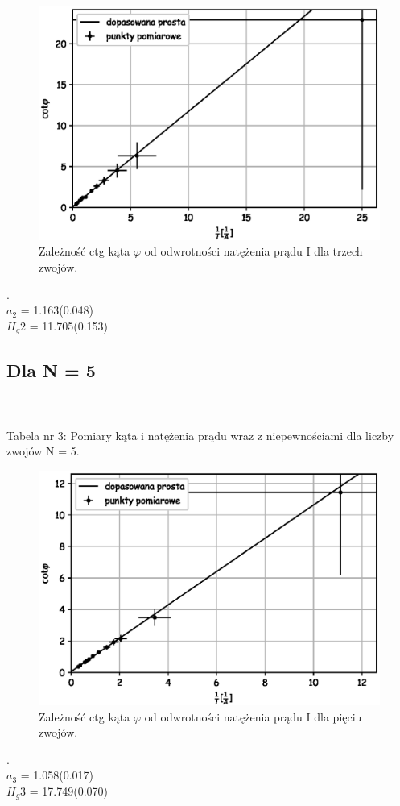 \documentclass[a4paper,10pt]{article}
\begin{document}
\begin{figure}[H]
  \includegraphics{./wykres_3.eps}
  \renewcommand*{\figurename}{Wykres nr} 
  \caption{Zależność ctg kąta $\varphi$ od odwrotności natężenia prądu I dla trzech zwojów.}
  \label{}
\end{figure}.
\\$a_2$ = 1.163(0.048)\\
$H_g2$ = 11.705(0.153)\\

\subsection{Dla N = 5}

\\
\\Tabela nr 3: Pomiary kąta i natężenia prądu wraz z niepewnościami dla liczby zwojów N = 5.

\begin{figure}[H]
  \includegraphics{./wykres_5.eps}
   \renewcommand*{\figurename}{Wykres nr} 
   \caption{Zależność ctg kąta $\varphi$ od odwrotności natężenia prądu I dla pięciu zwojów.}
  \label{}
\end{figure}.
\\$a_3$ = 1.058(0.017)\\
$H_g3$ = 17.749(0.070)\\
\end{document}
